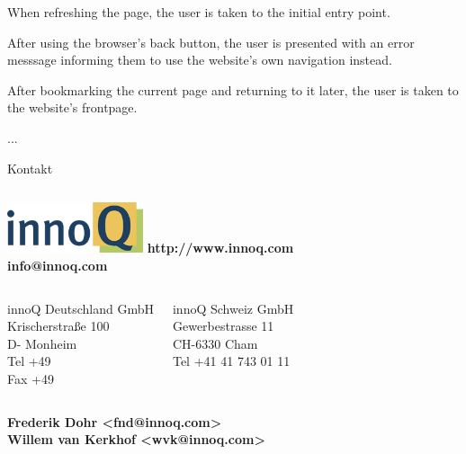 \documentclass{beamer}
\begin{document}
\begin{frame}
  When refreshing the page, the user is taken to the initial entry point.
\end{frame}

\begin{frame}
  After using the browser's back button, the user is presented with an error messsage informing them to use the website's own navigation instead.
\end{frame}

\begin{frame}
  After bookmarking the current page and returning to it later, the user is taken to the website's frontpage.
\end{frame}

\begin{frame}
  ...
\end{frame}

\begin{frame}{Kontakt}
  \begin{columns}
    \column{5cm}
    \includegraphics[width=4cm]{images/innoQ-Logo-RGB-72dpi.png}
    \vspace{4mm}
    \column{4.5cm}
    \textbf{http://www.innoq.com \\info@innoq.com}
  \end{columns}

  \begin{columns}
    \column{5cm}
      innoQ Deutschland GmbH\\
      Krischerstraße 100\\
      D- Monheim\\
      Tel     +49 \\
      Fax     +49

    \column{5cm}
      innoQ Schweiz GmbH \\
      Gewerbestrasse 11 \\
      CH-6330 Cham \\
      Tel     +41 41 743 01 11
    \end{columns}
  \vspace{10mm}

  \textbf{
    Frederik Dohr      <fnd@innoq.com> \\
    Willem van Kerkhof <wvk@innoq.com>
  }
\end{frame}
\end{document}
